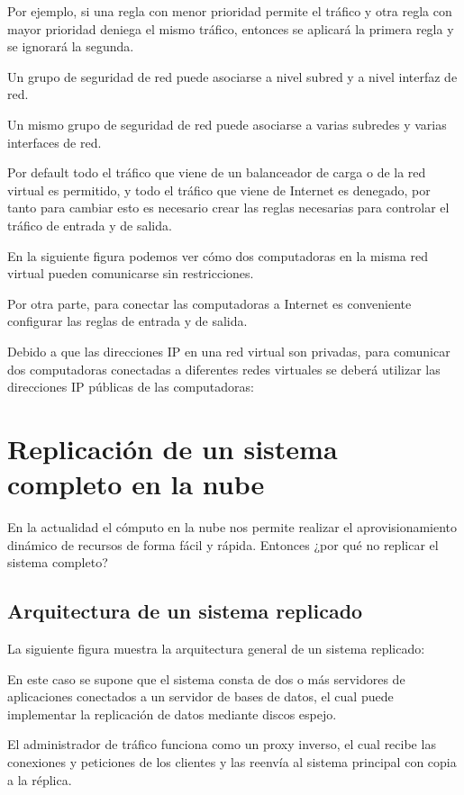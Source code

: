Por ejemplo, si una regla con menor prioridad permite el tráfico y otra regla con mayor prioridad deniega el mismo tráfico, entonces se aplicará la primera regla y se ignorará la segunda.

Un grupo de seguridad de red puede asociarse a nivel subred y a nivel interfaz de red.

Un mismo grupo de seguridad de red puede asociarse a varias subredes y varias interfaces de red.

Por default todo el tráfico que viene de un balanceador de carga o de la red virtual es permitido, y todo el tráfico que viene de Internet es denegado, por tanto para cambiar esto es necesario crear las reglas necesarias para controlar el tráfico de entrada y de salida.

En la siguiente figura podemos ver cómo dos computadoras en la misma red virtual pueden comunicarse sin restricciones.

Por otra parte, para conectar las computadoras a Internet es conveniente configurar las reglas de entrada y de salida.

Debido a que las direcciones IP en una red virtual son privadas, para comunicar dos computadoras conectadas a diferentes redes virtuales se deberá utilizar las direcciones IP públicas de las computadoras:

\clearpage


\chapter{Replicación de un sistema completo en la nube}

En la actualidad el cómputo en la nube nos permite realizar el aprovisionamiento dinámico de recursos de forma fácil y rápida. Entonces ¿por qué no replicar el sistema completo?

\section{Arquitectura de un sistema replicado}

La siguiente figura muestra la arquitectura general de un sistema replicado:

En este caso se supone que el sistema consta de dos o más servidores de aplicaciones conectados a un servidor de bases de datos, el cual puede implementar la replicación de datos mediante discos espejo.

El administrador de tráfico funciona como un proxy inverso, el cual recibe las conexiones y peticiones de los clientes y las reenvía al sistema principal con copia a la réplica.

